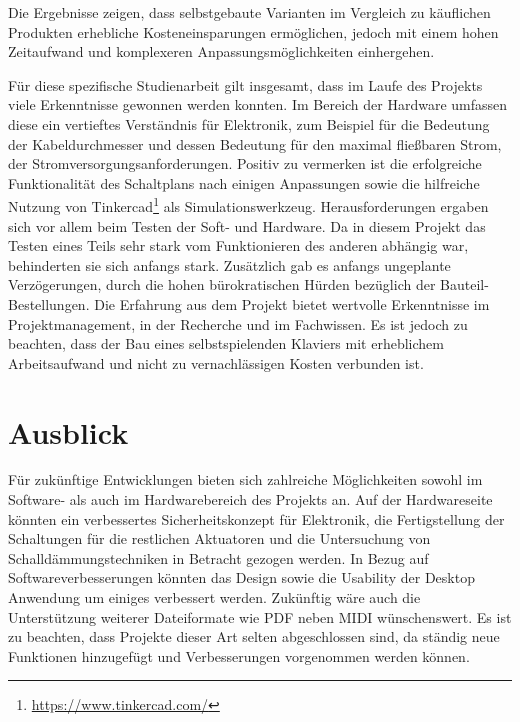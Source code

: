 Die Ergebnisse zeigen, dass selbstgebaute Varianten im Vergleich zu käuflichen Produkten erhebliche Kosteneinsparungen
ermöglichen, jedoch mit einem hohen Zeitaufwand und komplexeren Anpassungsmöglichkeiten einhergehen.

Für diese spezifische Studienarbeit gilt insgesamt, dass im Laufe des Projekts viele Erkenntnisse gewonnen werden konnten.
Im Bereich der Hardware umfassen diese ein vertieftes Verständnis für Elektronik, zum Beispiel für die Bedeutung der Kabeldurchmesser
und dessen Bedeutung für den maximal fließbaren Strom, der Stromversorgungsanforderungen.
Positiv zu vermerken ist die erfolgreiche Funktionalität des Schaltplans nach einigen Anpassungen sowie die hilfreiche
Nutzung von Tinkercad\footnote{\url{https://www.tinkercad.com/}} als Simulationswerkzeug. \newline
Herausforderungen ergaben sich vor allem beim Testen der Soft- und Hardware.
Da in diesem Projekt das Testen eines Teils sehr stark vom Funktionieren des anderen abhängig war,
behinderten sie sich anfangs stark.
Zusätzlich gab es anfangs ungeplante Verzögerungen, durch die hohen bürokratischen Hürden bezüglich der Bauteil-Bestellungen.
Die Erfahrung aus dem Projekt bietet wertvolle Erkenntnisse im Projektmanagement, in der Recherche und im Fachwissen.
Es ist jedoch zu beachten, dass der Bau eines selbstspielenden Klaviers mit erheblichem Arbeitsaufwand und nicht zu
vernachlässigen Kosten verbunden ist.

\section{Ausblick}

Für zukünftige Entwicklungen bieten sich zahlreiche Möglichkeiten sowohl im Software- als auch im Hardwarebereich des Projekts an.
Auf der Hardwareseite könnten ein verbessertes Sicherheitskonzept für Elektronik, die Fertigstellung der Schaltungen für die
restlichen Aktuatoren und die Untersuchung von Schalldämmungstechniken in Betracht gezogen werden.
In Bezug auf Softwareverbesserungen könnten das Design sowie die Usability der Desktop Anwendung um einiges verbessert werden. Zukünftig wäre auch die Unterstützung weiterer Dateiformate wie PDF neben \ac{MIDI} wünschenswert.
Es ist zu beachten, dass Projekte dieser Art selten abgeschlossen sind, da ständig neue Funktionen hinzugefügt und
Verbesserungen vorgenommen werden können.

